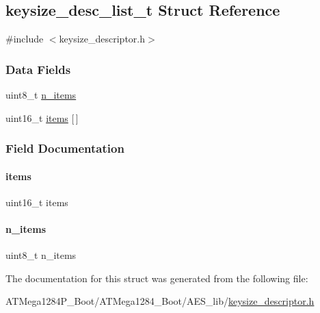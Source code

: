 \hypertarget{structkeysize__desc__list__t}{}\subsection{keysize\+\_\+desc\+\_\+list\+\_\+t Struct Reference}
\label{structkeysize__desc__list__t}


{\ttfamily \#include $<$keysize\+\_\+descriptor.\+h$>$}

\subsubsection*{Data Fields}
\begin{DoxyCompactItemize}
\item 
uint8\+\_\+t \hyperlink{structkeysize__desc__list__t_abcd9a991b1172a5f64c016fedc1b6f10}{n\+\_\+items}
\item 
uint16\+\_\+t \hyperlink{structkeysize__desc__list__t_a18c4aab24c99a9a27d309f7b701c3015}{items} \mbox{[}$\,$\mbox{]}
\end{DoxyCompactItemize}


\subsubsection{Field Documentation}
\mbox{\label{structkeysize__desc__list__t_a18c4aab24c99a9a27d309f7b701c3015}} 
\paragraph{\texorpdfstring{items}{items}}
{\footnotesize\ttfamily uint16\+\_\+t items}

\mbox{\label{structkeysize__desc__list__t_abcd9a991b1172a5f64c016fedc1b6f10}} 
\paragraph{\texorpdfstring{n\+\_\+items}{n\_items}}
{\footnotesize\ttfamily uint8\+\_\+t n\+\_\+items}



The documentation for this struct was generated from the following file\+:\begin{DoxyCompactItemize}
\item 
A\+T\+Mega1284\+P\+\_\+\+Boot/\+A\+T\+Mega1284\+\_\+\+Boot/\+A\+E\+S\+\_\+lib/\hyperlink{_a_t_mega1284_p___boot_2_a_t_mega1284___boot_2_a_e_s__lib_2keysize__descriptor_8h}{keysize\+\_\+descriptor.\+h}\end{DoxyCompactItemize}

